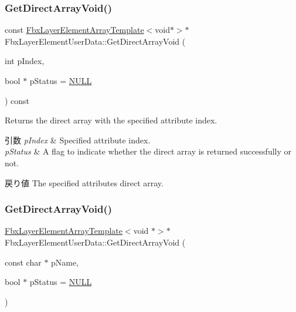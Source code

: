 \subsubsection{\texorpdfstring{Get\+Direct\+Array\+Void()}{GetDirectArrayVoid()}\hspace{0.1cm}{\footnotesize\ttfamily [2/4]}}
{\footnotesize\ttfamily const \hyperlink{class_fbx_layer_element_array_template}{Fbx\+Layer\+Element\+Array\+Template}$<$void$\ast$$>$$\ast$ Fbx\+Layer\+Element\+User\+Data\+::\+Get\+Direct\+Array\+Void (\begin{DoxyParamCaption}\item[{int}]{p\+Index,  }\item[{bool $\ast$}]{p\+Status = {\ttfamily \hyperlink{fbxarch_8h_a070d2ce7b6bb7e5c05602aa8c308d0c4}{N\+U\+LL}} }\end{DoxyParamCaption}) const}

Returns the direct array with the specified attribute index. 
\begin{DoxyParams}{引数}
{\em p\+Index} & Specified attribute index. \\
\hline
{\em p\+Status} & A flag to indicate whether the direct array is returned successfully or not. \\
\hline
\end{DoxyParams}
\begin{DoxyReturn}{戻り値}
The specified attribute\textquotesingle{}s direct array. 
\end{DoxyReturn}
\mbox{\label{class_fbx_layer_element_user_data_aefbd9aaf1002ca95053801db3f6dec53}} 
\subsubsection{\texorpdfstring{Get\+Direct\+Array\+Void()}{GetDirectArrayVoid()}\hspace{0.1cm}{\footnotesize\ttfamily [3/4]}}
{\footnotesize\ttfamily \hyperlink{class_fbx_layer_element_array_template}{Fbx\+Layer\+Element\+Array\+Template}$<$void $\ast$$>$$\ast$ Fbx\+Layer\+Element\+User\+Data\+::\+Get\+Direct\+Array\+Void (\begin{DoxyParamCaption}\item[{const char $\ast$}]{p\+Name,  }\item[{bool $\ast$}]{p\+Status = {\ttfamily \hyperlink{fbxarch_8h_a070d2ce7b6bb7e5c05602aa8c308d0c4}{N\+U\+LL}} }\end{DoxyParamCaption})}

